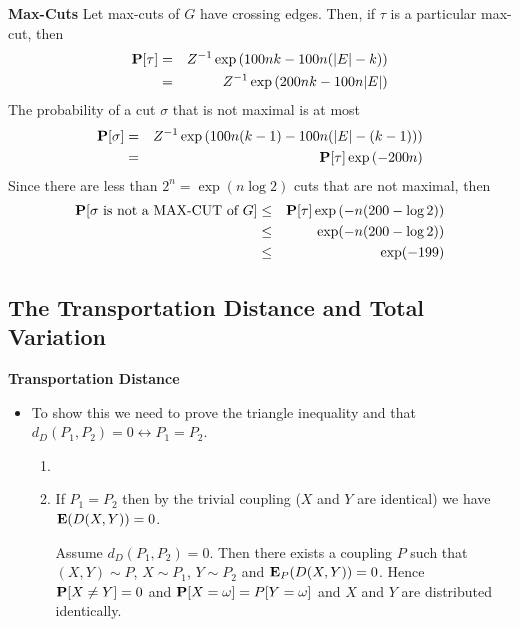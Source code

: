 \documentclass[11pt]{article} \usepackage{amssymb}
\newcommand{\E}{{\bf E}} \newcommand{\Cov}{{\bf Cov}}
\begin{document}
{\bf Max-Cuts}
Let max-cuts of $G$ have crossing edges. Then, if $\tau$ is a particular
max-cut, then
\begin{eqnarray*}
  \P[\tau]&=&Z^{-1}\exp\left(100nk-100n(|E|-k)\right)
  \\ &=& Z^{-1}\exp\left(200nk-100n|E|\right)
\end{eqnarray*}
The probability of a cut $\sigma$ that is not maximal is at most
\begin{eqnarray*}
  \P[\sigma]&=&Z^{-1}\exp\left(100n(k-1)-100n(|E|-(k-1))\right)
  \\ &=& \P[\tau]\exp\left(-200n\right)
\end{eqnarray*}
Since there are less than $2^n=\exp(n\log 2)$ cuts that are not maximal, then
\begin{eqnarray*}
  \P[\sigma\mbox{ is not a MAX-CUT of $G$}] &\leq& \P[\tau]\exp\left(-n(200-\log 2)\right)
\\ &\leq& \exp(-n(200-\log 2)) 
\\ &\leq& \exp(-199) 
\end{eqnarray*}

\subsection{The Transportation Distance and Total Variation}
{\bf Transportation Distance}
\begin{itemize}
\item To show this we need to prove the triangle inequality and that
  $d_D(P_1,P_2)=0 \leftrightarrow P_1=P_2$.
  \begin{enumerate}
  \item
    
  \item If $P_1=P_2$ then by the trivial coupling ($X$ and $Y$ are identical)
    we have $\E(D(X,Y))=0$. 

    Assume $d_D(P_1,P_2)=0$. Then there exists a coupling $P$ such that  
    $(X,Y)\sim P$,
    $X\sim P_1$, $Y\sim P_2$ and $\E_P(D(X,Y))=0$. Hence $\P[X\neq Y]=0$ and
    $\P[X=\omega]=P[Y=\omega]$ and $X$ and $Y$ are distributed identically.
  \end{enumerate}
\end{itemize}
\end{document}
